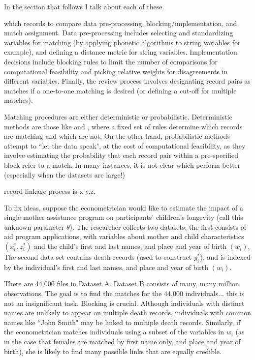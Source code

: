 \documentclass[12pt]{article}
\begin{document}
In the section that follows I talk about each of these. 

  which records to compare  data pre-processing, blocking/implementation, and match assignment.  Data pre-processing includes selecting and standardizing variables for matching (by applying phonetic algorithms to string variables for example), and defining a distance metric for string variables.  Implementation decisions include blocking rules to limit the number of comparisons for computational feasibility and picking relative weights for disagreements in different variables.   Finally, the review process involves designating record pairs as matches if a one-to-one matching is desired (or defining a cut-off for multiple matches). 

Matching procedures are either deterministic or probabilistic.   Deterministic methods are those like \cite{abe} and \cite{ferrie}, where a fixed set of rules determine which records are matching and which are not.  On the other hand, probabilistic methods attempt to ``let the data speak", at the cost of computational feasibility, as they involve estimating the probability that each record pair within a pre-specified block refer to a match.  In many instances, it is not clear which perform better (especially when the datasets are large!)


record linkage process is x y,z, 





To fix ideas, suppose the econometrician would like to estimate the impact of a single mother assistance program on participants' children's longevity (call this unknown parameter $\theta$).  The researcher collects two datasets; the first consists of aid program applications, with variables about mother and child characteristics $(x_i^*, z_i^*)$ and the child's first and last names, and place and year of birth $(w_i)$.  The second data set contains death records (used to construct $y_i^*$), and is indexed by the individual's first and last names, and place and year of birth $(w_i)$.    





There are 44,000 files in Dataset A.  Dataset B consists of many, many million observations.  The goal is to find the matches for the 44,000 individuals... this is not an insignificant task.  Blocking is crucial. 
Although individuals with distinct names are unlikely to appear on multiple death records, individuals with common names like ``John Smith" may be linked to multiple death records.  Similarly, if the econometrician matches individuals using a subset of the variables in $w_i$ (as in the case that females are matched by first name only, and place and year of birth), she is likely to find many possible links that are equally credible.  
\end{document}
